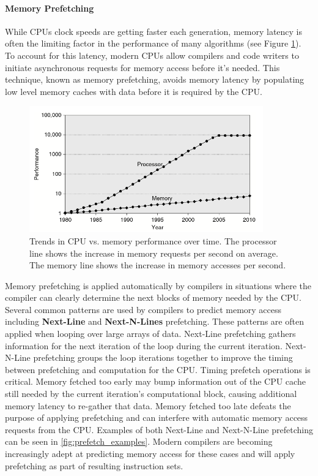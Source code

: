 \paragraph{Memory Prefetching}

While CPUs clock speeds are getting faster each generation, memory latency is
often the limiting factor in the performance of many algorithms (see Figure
\ref{fig:memory_latency}). To account for this latency, modern CPUs allow
compilers and code writers to initiate asynchronous requests for memory access
before it's needed. This technique, known as memory prefetching, avoids memory
latency by populating low level memory caches with data before it is required by
the CPU.

\begin{figure}[H]
\centering
\includegraphics[width=0.9\textwidth]{../images/mem_latency.png}
\caption[Memory latency comparison over time.]{Trends in CPU vs. memory
  performance over time. The processor line shows the increase in memory
  requests per second on average. The memory line shows the increase in memory
  accesses per second. \cite{Henessy_2012}}
\label{fig:memory_latency}
\end{figure}

Memory prefetching is applied automatically by compilers in situations where the
compiler can clearly determine the next blocks of memory needed by the
CPU. Several common patterns are used by compilers to predict memory access
including \textbf{Next-Line} and \textbf{Next-N-Lines} prefetching. These
patterns are often applied when looping over large arrays of data. Next-Line
prefetching gathers information for the next iteration of the loop during the
current iteration. Next-N-Line prefetching groups the loop iterations together
to improve the timing between prefetching and computation for the CPU. Timing
prefetch operations is critical. Memory fetched too early may bump information
out of the CPU cache still needed by the current iteration's computational
block, causing additional memory latency to re-gather that data. Memory fetched
too late defeats the purpose of applying prefetching and can interfere with
automatic memory access requests from the CPU. Examples of both Next-Line and
Next-N-Line prefetching can be seen in \ref{fig:prefetch_examples}. Modern
compilers are becoming increasingly adept at predicting memory access for these
cases and will apply prefetching as part of resulting instruction sets.

